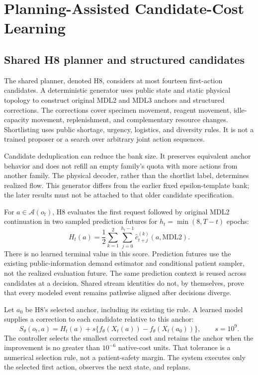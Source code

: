 \documentclass[preprint,12pt]{elsarticle}
\begin{document}
\section{Planning-Assisted Candidate-Cost Learning}
\label{sec:method}
\subsection{Shared H8 planner and structured candidates}
The shared planner, denoted H8, considers at most fourteen first-action
candidates. A deterministic generator uses public state and static physical
topology to construct original MDL2 and MDL3 anchors and structured corrections.
The corrections cover specimen movement, reagent movement, idle-capacity
movement, replenishment, and complementary resource changes. Shortlisting
uses public shortage, urgency, logistics, and diversity rules. It is not a
trained proposer or a search over arbitrary joint action sequences.

Candidate deduplication can reduce the bank size. It preserves equivalent
anchor behavior and does not refill an empty family's quota with more actions
from another family. The physical decoder, rather than the shortlist label,
determines realized flow. This generator differs from the earlier fixed
epsilon-template bank; the later results must not be attached to that older
candidate specification.

For $a\in\mathcal A(o_t)$, H8 evaluates the first request followed by original
MDL2 continuation in two sampled prediction futures for
$h_t=\min(8,T-t)$ epochs:
\begin{equation}
 H_t(a)=\frac{1}{2}\sum_{k=1}^{2}
        \sum_{j=0}^{h_t-1}\widehat c_{t+j}^{(k)}(a,\mathrm{MDL2}).
 \label{eq:h8}
\end{equation}
There is no learned terminal value in this score. Prediction futures use the
existing public-information demand estimator and conditional patient sampler,
not the realized evaluation future. The same prediction context is reused
across candidates at a decision. Shared stream identities do not, by themselves,
prove that every modeled event remains pathwise aligned after decisions diverge.

Let $a_0$ be H8's selected anchor, including its existing tie rule. A learned
model supplies a correction to each candidate relative to this anchor:
\begin{equation}
 S_\theta(o_t,a)=H_t(a)+s\{f_\theta(X_t(a))-f_\theta(X_t(a_0))\},
 \qquad s=10^9.
 \label{eq:decision}
\end{equation}
The controller selects the smallest corrected cost and retains the anchor when
the improvement is no greater than $10^{-6}$ native-cost units. That tolerance
is a numerical selection rule, not a patient-safety margin. The system executes
only the selected first action, observes the next state, and replans.
\end{document}
